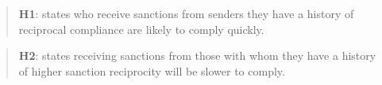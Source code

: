 \begin{quote}
	\textbf{H1}: states who receive sanctions from senders they have a history of reciprocal compliance are likely to comply quickly. 
\end{quote}

\begin{quote}
	\textbf{H2}: states receiving sanctions from those with whom they have a history of higher sanction reciprocity will be slower to comply.
\end{quote}

%
